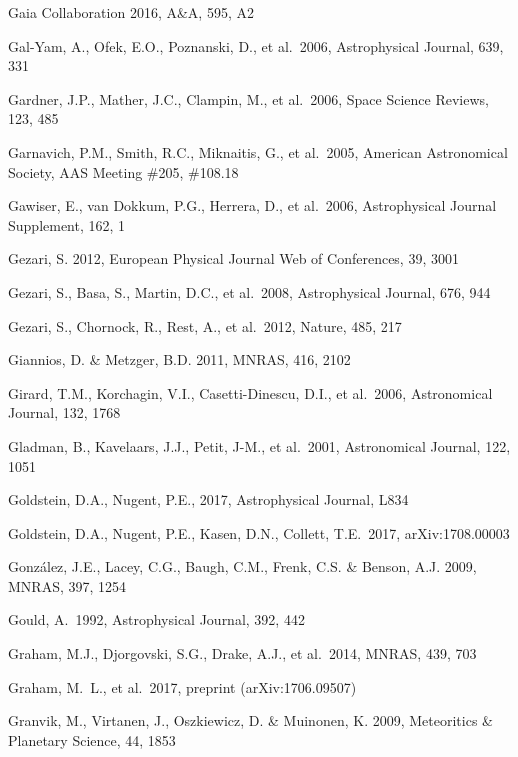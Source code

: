 \documentclass[twocolumn]{aastex61}
\begin{document}
\begin{thebibliography}{}
 Gaia Collaboration 2016, A\&A, 595, A2

\bibitem[()]{} Gal-Yam, A., Ofek, E.O., Poznanski, D., et al.~2006, Astrophysical Journal, 639, 331

\bibitem[()]{} Gardner, J.P., Mather, J.C., Clampin, M., et al.~2006, Space Science Reviews, 123, 485

\bibitem[()]{} Garnavich, P.M., Smith, R.C., Miknaitis, G., et al.~2005,
             American Astronomical Society, AAS Meeting \#205, \#108.18

\bibitem[()]{} Gawiser, E., van Dokkum, P.G., Herrera, D., et al.~2006, Astrophysical Journal Supplement, 162, 1


\bibitem[()]{} Gezari, S. 2012, European Physical Journal Web of Conferences, 39, 3001

\bibitem[()]{} Gezari, S., Basa, S., Martin, D.C., et al.~2008, Astrophysical Journal, 676, 944

\bibitem[()]{} Gezari, S., Chornock, R., Rest, A., et al.~2012, Nature, 485, 217

\bibitem[()]{} Giannios, D. \& Metzger, B.D. 2011, MNRAS, 416, 2102

\bibitem[()]{} Girard, T.M., Korchagin, V.I., Casetti-Dinescu, D.I., et al.~2006, Astronomical
             Journal, 132, 1768

\bibitem[()]{} Gladman, B., Kavelaars, J.J., Petit, J-M., et al.~2001, Astronomical Journal, 122, 1051

\bibitem[()]{} Goldstein, D.A., Nugent, P.E., 2017, Astrophysical Journal, L834

\bibitem[()]{} Goldstein, D.A., Nugent, P.E., Kasen, D.N., Collett, T.E.~2017, arXiv:1708.00003

\bibitem[()]{} Gonz\'{a}lez, J.E., Lacey, C.G., Baugh, C.M., Frenk, C.S. \& Benson, A.J. 2009, MNRAS, 397, 1254

\bibitem[()]{} Gould, A.\ 1992, Astrophysical Journal, 392, 442

\bibitem[()]{} Graham, M.J., Djorgovski, S.G., Drake, A.J., et al.~2014, MNRAS, 439, 703

\bibitem[()]{} Graham, M.~L., et al.~2017, preprint (arXiv:1706.09507)

\bibitem[()]{} Granvik, M., Virtanen, J., Oszkiewicz, D. \& Muinonen, K. 2009, Meteoritics \& Planetary Science, 44, 1853


\end{thebibliography}
\end{document}
